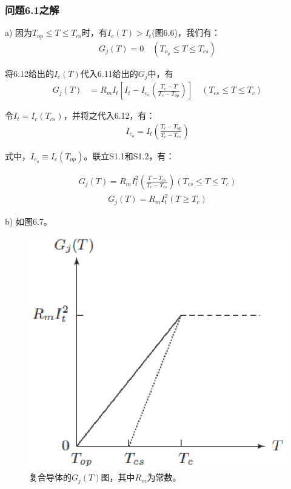 \subsubsection{问题6.1之解}
a) 因为$T_{op}\le T\le T_{cs}$时，有$I_c(T)>I_t$(图6.6)，我们有：
\begin{align*}
G_j(T)=0 \quad (T_{o_p}\leq T \leq T_{cs}) \tag{6.13a}
\end{align*}

将6.12给出的$I_c(T)$代入6.11给出的$G_j$中，有
\begin{align*}
G_j(T)&=R_m I_t[I_t-I_{c_o} \left(\frac{T_c-T}{T_c-T_{op}}\right)]\quad (T_{cs}\leq T\leq T_c) \tag{S1.1}
\end{align*}

令$I_t=I_c(T_{cs})$，并将之代入6.12，有：
\begin{align*}%
I_{c_o}=I_t\left(\frac{T_c-T_{op} }{T_c-T_{cs}}\right) \tag{S1.2}
\end{align*}

式中，$I_{c_o}\equiv I_c(T_{op})$。联立S1.1和S1.2，有：

\begin{align*}
	G_j(T)=R_mI_t^2(\frac{T-T_{cs}}{T_c-T_{cs}}) (T_{cs}\leq T\leq T_c) \tag{6.13b}
\end{align*}
\begin{align*}
    G_j(T)=R_mI_t^2 (T\ge T_c) \tag{6.13c}
\end{align*}


b) 如图6.7。
\begin{figure}[htbp]
	\centering
	\includegraphics[scale=0.7]{chpt6/figs/fig6.7.eps}
	\caption{复合导体的$G_j(T)$图，其中$R_m$为常数。}
\end{figure}

